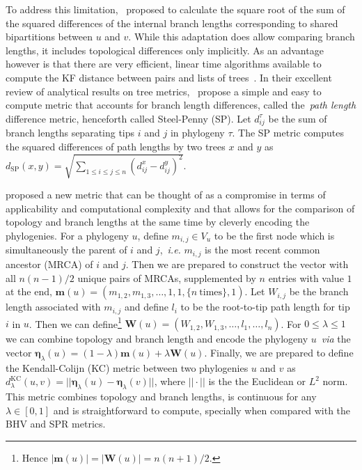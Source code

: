 To address this limitation,~\cite{Kuhner1994} proposed to calculate the square root of the sum of the squared differences of the internal branch lengths corresponding to shared bipartitions between $u$ and $v$.
While this adaptation does allow comparing branch lengths, it includes topological differences only implicitly.
As an advantage however is that there are very efficient, linear time algorithms available to compute the KF distance between pairs and lists of trees~\citep{Pattengale2007}.
In their excellent review of analytical results on tree metrics,~\cite{Steel1993} propose a simple and easy to compute metric that accounts for branch length differences, called the~\textit{path length} difference metric, henceforth called Steel-Penny (SP).
Let $d_{ij}^\tau$ be the sum of branch lengths separating tips $i$ and $j$ in phylogeny $\tau$. 
The SP metric computes the squared differences of path lengths by two trees $x$ and $y$ as $d_{\text{SP}}(x, y) = \sqrt{\sum_{1 \leq i \leq j \leq n} (d_{ij}^x - d_{ij}^y)^2 }$.

\cite{Kendall2016} proposed a new metric that can be thought of as a compromise in terms of applicability and computational complexity and that allows for the comparison of topology and branch lengths at the same time by cleverly encoding the phylogenies.
For a phylogeny $u$, define $m_{i,j} \in V_u$ to be the first node which is simultaneously the parent of $i$ and $j$,~\textit{i.e.}  $m_{i,j}$ is the most recent common ancestor (MRCA) of $i$ and $j$.
Then we are prepared to construct the vector with all $n(n-1)/2$ unique pairs of MRCAs, supplemented by $n$ entries with value $1$ at the end,  $\boldsymbol m(u) = \left( m_{1,2}, m_{1, 3}, \ldots, 1, 1, \{ n\:\text{times}  \}, 1 \right)$.
Let $W_{i,j}$ be the branch length associated with $m_{i,j}$ and define $l_i$ to be the root-to-tip path length for tip $i$ in $u$.
Then we can define\footnote{Hence $|\boldsymbol m(u)| = |\boldsymbol W(u)| = n(n+1)/2$.} $\boldsymbol W(u) = \left( W_{1,2}, W_{1,3}, \ldots, l_1, \ldots, l_n \right)$.
For $ 0 \leq \lambda  \leq 1$ we can combine topology and branch length and encode the phylogeny $u$~\textit{via} the vector $\boldsymbol\eta_\lambda(u) = (1-\lambda)\boldsymbol m(u) + \lambda \boldsymbol W(u)$.
Finally, we are prepared to define the Kendall-Colijn (KC) metric between two phylogenies $u$ and $v$ as $d_\lambda^{\text{KC}}(u, v) = ||\boldsymbol\eta_\lambda(u) -\boldsymbol\eta_\lambda(v)||$, where $||\cdot||$ is the the Euclidean or $L^2$ norm.
This metric combines topology and branch lengths, is continuous for any $\lambda \in [0, 1]$ and is straightforward to compute, specially when compared with the BHV and SPR metrics.

